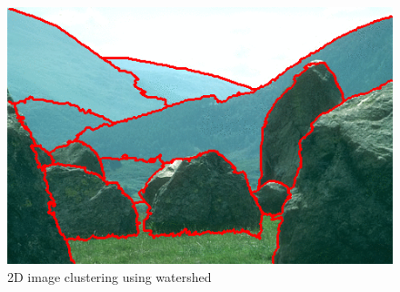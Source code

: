   \begin{figure}[h]\label{watershed on image}
  \centering
  \includegraphics[width=.7\linewidth]{chapter_2/files/PW_overlay.png}
  \caption{2D image clustering using watershed}
  \end{figure}
